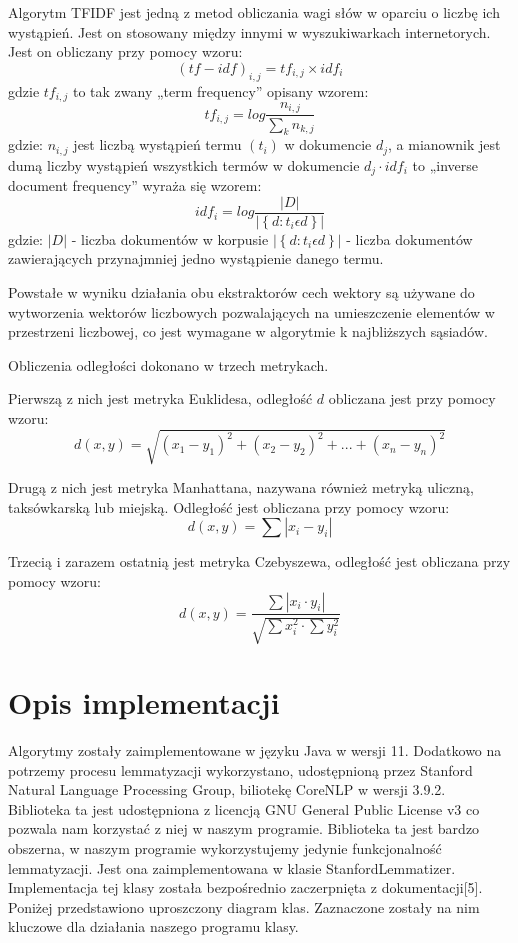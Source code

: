 \documentclass{classrep}
\begin{document}
	Algorytm TFIDF jest jedną z metod obliczania wagi słów w oparciu o liczbę ich wystąpień. Jest on stosowany między innymi w wyszukiwarkach internetorych. Jest on obliczany przy pomocy wzoru:
\[ \left ( tf-idf \right )_{i,j}=tf_{i,j} \times idf_{i} \]
gdzie \( tf_{i,j} \) to tak zwany „term frequency” opisany wzorem:
\[ tf_{i,j}=log \frac{n_{i,j}}{\sum _{k}n_{k,j}} \]
gdzie: \( n_{i,j} \) jest liczbą wystąpień termu \( \left ( t_{i} \right ) \) w dokumencie \( d_{j}\), a mianownik jest dumą liczby wystąpień wszystkich termów w dokumencie \( d_{j} \cdot idf_{i} \) to „inverse document frequency” wyraża się wzorem:
\[ idf_{i}=log \frac{|D|}{| \left \{ d: t_{i} \epsilon d \right \} |} \]
gdzie:
\( |D| \) - liczba dokumentów w korpusie
\( | \left \{ d: t_{i} \epsilon d \right \} | \) - liczba dokumentów zawierających przynajmniej jedno wystąpienie danego termu.

	Powstałe w wyniku działania obu ekstraktorów cech wektory są używane do wytworzenia wektorów liczbowych pozwalających na umieszczenie elementów w przestrzeni liczbowej, co jest wymagane w algorytmie k najbliższych sąsiadów.
	
	Obliczenia odległości dokonano w trzech metrykach.
	
	Pierwszą z nich jest metryka Euklidesa, odległość \( d \) obliczana jest przy pomocy wzoru: 
\[ d\left ( x,y \right )=\sqrt{\left ( x_{1}-y_{1} \right )^{2} + \left ( x_{2}-y_{2} \right )^{2} + ... + \left ( x_{n}-y_{n} \right )^{2}} \]

	Drugą z nich jest metryka Manhattana, nazywana również metryką uliczną, taksówkarską lub miejską. Odległość jest obliczana przy pomocy wzoru:
\[ d\left ( x,y \right )=\sum|x_{i}-y_{i}| \]

	Trzecią i zarazem ostatnią jest metryka Czebyszewa, odległość jest obliczana przy pomocy wzoru:
\[ d\left ( x,y \right )=\frac{\sum|x_{i} \cdot y_{i}|}{\sqrt{ \sum x_{i}^{2} \cdot \sum y_{i}^{2} }} \]


\section{Opis implementacji}
Algorytmy zostały zaimplementowane w języku Java w wersji 11. Dodatkowo na potrzemy procesu lemmatyzacji wykorzystano, udostępnioną przez Stanford Natural Language Processing Group, biliotekę CoreNLP w wersji 3.9.2. Biblioteka ta jest udostępniona z licencją GNU General Public License v3 co pozwala nam korzystać z niej w naszym programie. Biblioteka ta jest bardzo obszerna, w naszym programie wykorzystujemy jedynie funkcjonalność lemmatyzacji. Jest ona zaimplementowana w klasie StanfordLemmatizer. Implementacja tej klasy została bezpośrednio zaczerpnięta z dokumentacji[5]. Poniżej przedstawiono uproszczony diagram klas. Zaznaczone zostały na nim kluczowe dla działania naszego programu klasy.\\
\end{document}
